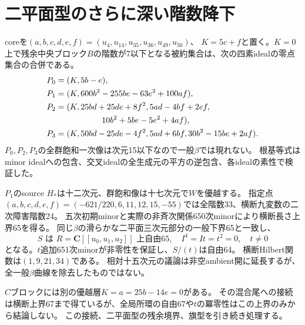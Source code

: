 \documentclass[11pt,a4paper]{ltjsarticle}
\newcommand{\CC}{\mathbf C}
\theoremstyle{remark}
\begin{document}
\section{二平面型のさらに深い階数降下}
coreを$(a,b,c,d,e,f)=(u_4,u_{14},u_{35},u_{36},u_{49},u_{50})$、
$K=5c+f$と置く。$K=0$上で残余中央ブロック$B$の階数が7以下となる被約集合は、次の四素idealの零点集合の合併である。
\begin{align*}
P_0={}&(K,5b-e),\\
P_1={}&(K,600b^2-255be-63e^2+100af),\\
P_2={}&(K,25bd+25de+8f^2,5ad-4bf+2ef,\\
 &\hspace{15mm}10b^2+5be-5e^2+4af),\\
P_3={}&(K,50bd-25de-4f^2,5ad+6bf,30b^2-15be+2af).
\end{align*}
$P_0,P_2,P_3$の全群飽和一次像は次元15以下なので一般$\beta$では現れない。
根基等式はminor idealへの包含、交叉idealの全生成元の平方の逆包含、各idealの素性で検証した\cite{binary-deeper-reduction-v39}。

$P_1$のsource $H_*$は十二次元、群飽和像は十七次元で$W$を優越する。
指定点$(a,b,c,d,e,f)=(-621/220,6,11,12,15,-55)$では全階数33、横断九変数の二次障害階数24。
五次初期minorと実際の非斉次関係650次minorにより横断長さ上界65を得る。
同じ$\beta$の滑らかな二平面三次元部分の一般下界65と一致し、
\[
 S\text{ は }R=\CC[[u_0,u_1,u_2]]\text{ 上自由65},\quad
 I^4=It=t^2=0,\quad t\ne0
\]
となる。$t$追加651次minorが非零性を保証し、$S/(t)$は自由64。
横断Hilbert関数は$(1,9,21,34)$である\cite{binary-deeper-v39}。
相対十五次元の議論は非空ambient開に延長するが、全一般$\beta$曲線を除去したものではない。

$C$ブロックには別の優越層$K=a=25b-14e=0$がある。
その混合尾への接続は横断上界67まで得ているが、全局所環の自由67や$t$の冪零性はこの上界のみから結論しない。
この接続、二平面型の残余境界、旗型を引き続き処理する。
\end{document}
